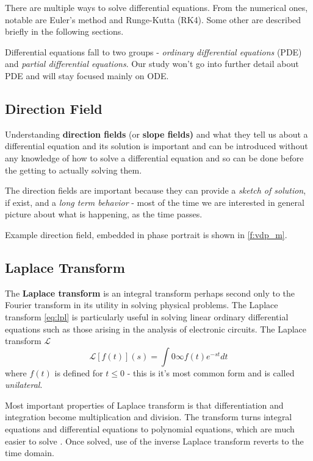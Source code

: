 \documentclass[journal]{IEEEtran}
\begin{document}
There are multiple ways to solve differential equations. From the numerical ones, notable are Euler's method and Runge-Kutta (RK4). Some other are described briefly in the following sections.

Differential equations fall to two groups - \textit{ordinary differential equations} (PDE) and \textit{partial differential equations}. Our study won't go into further detail about PDE and will stay focused mainly on ODE.


\subsection{Direction Field}
Understanding \textbf{direction fields} (or \textbf{slope fields)} and what they tell us about a differential equation and its solution is important and can be introduced without any knowledge of how to solve a differential equation and so can be done before the getting to actually solving them. 


The direction fields are important because they can provide a \textit{sketch of solution}, if exist, and a \textit{long term behavior} - most of the time we are interested in general picture about what is happening, as the time passes.

Example direction field, embedded in phase portrait is shown in \cref{f:vdp_m}.

\subsection{Laplace Transform}
The \textbf{Laplace transform} is an integral transform perhaps second only to the Fourier transform in its utility in solving physical problems. The Laplace transform \eqref{eq:lpl} is particularly useful in solving linear ordinary differential equations such as those arising in the analysis of electronic circuits. The Laplace transform $\mathcal{L}$
\begin{equation}
\label{eq:lpl} 
\mathcal{L}[f(t)](s)=\int{0}{\infty} f(t)e^{-st}dt
\end{equation}
where $f(t)$ is defined for $t\le 0$ - this is it's most common form and is called \textit{unilateral}.

Most important properties of Laplace transform is that differentiation and integration become multiplication and division. The transform turns integral equations and differential equations to polynomial equations, which are much easier to solve \cite{schiff2013laplace}. Once solved, use of the inverse Laplace transform reverts to the time domain.
\end{document}
